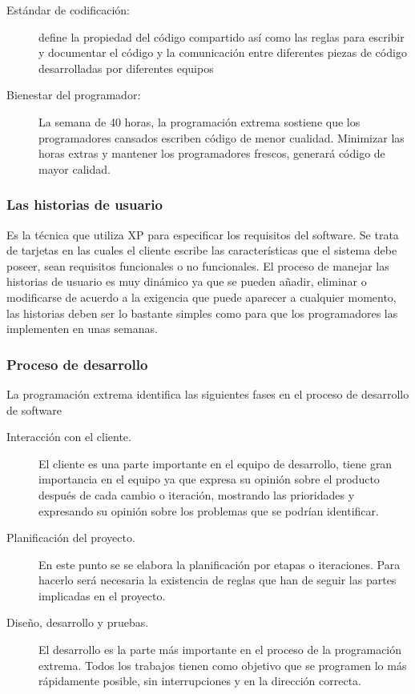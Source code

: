 \begin{description}
        \item[Estándar de codificación:] define la propiedad del código compartido así como las reglas para escribir y documentar el código y la comunicación entre diferentes piezas de código desarrolladas por diferentes equipos

        \item[Bienestar del programador:] La semana de 40 horas, la programación extrema sostiene que los programadores cansados escriben código de menor cualidad. Minimizar las horas extras y mantener los programadores frescos, generará código de mayor calidad.

      \end{description}


      \subsubsection{Las historias de usuario}
      \label{subs:user_story}


      Es la técnica que utiliza XP para especificar los requisitos del software. Se trata de tarjetas en las cuales el cliente escribe las características que el sistema debe poseer, sean requisitos funcionales o no funcionales. El proceso de manejar las historias de usuario es muy dinámico ya que se pueden añadir, eliminar o modificarse de acuerdo a la exigencia que puede aparecer a cualquier momento, las historias deben ser lo bastante simples como para que los programadores las implementen en unas semanas.\cite{xpesp}

      \subsubsection{Proceso de desarrollo}
      \label{subs:proceso_desarollo}

      La programación extrema identifica las siguientes fases en el proceso de desarrollo de software

      \begin{description}
        \item[Interacción con el cliente.]
        El cliente es una parte importante en el equipo de desarrollo, tiene gran importancia en el equipo ya que expresa su opinión sobre el producto después de cada cambio o iteración, mostrando las prioridades y expresando su opinión sobre los problemas que se podrían identificar.

        \item[Planificación del proyecto.]
        En este punto se se elabora la planificación por etapas o iteraciones. Para hacerlo será necesaria la existencia de reglas que han de seguir las partes implicadas en el proyecto.

        \item[Diseño, desarrollo y pruebas.]
        El desarrollo es la parte más importante en el proceso de la programación extrema. Todos los trabajos tienen como objetivo que se programen lo más rápidamente posible, sin interrupciones y en la dirección correcta.\cite{xpesp}

      \end{description}


